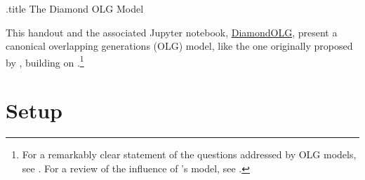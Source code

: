 \documentclass{handout}
\begin{document}
\handoutHeader

\begin{verbatimwrite}{\jobname.title}
The Diamond OLG Model
\end{verbatimwrite}

\handoutNameMake

This handout and the associated Jupyter notebook, \href{https://econ-ark.org/materials/diamondolg?launch}{DiamondOLG}, present a canonical overlapping generations (OLG) model, like the one originally proposed by \cite{diamond:olg}, building on \cite{samuelson:olg}.\footnote{For a remarkably clear statement of the questions addressed by OLG models, see \cite{jeffersonOLG}.  For a review of the influence of \cite{samuelson:olg}'s model, see \cite{weilSamuelson}.}

\section{Setup}
\end{document}

